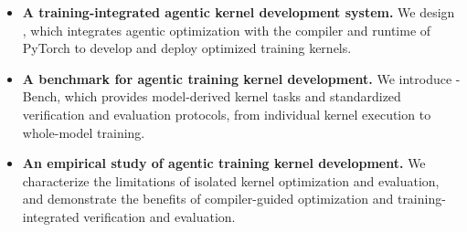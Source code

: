 \begin{itemize}
    \item \textbf{A training-integrated agentic kernel development system.} We design \name, which integrates agentic optimization with the compiler and runtime of PyTorch to develop and deploy optimized training kernels.
    \item \textbf{A benchmark for agentic training kernel development.} We introduce \name-Bench, which provides model-derived kernel tasks and standardized verification and evaluation protocols, from individual kernel execution to whole-model training.
    \item \textbf{An empirical study of agentic training kernel development.} We characterize the limitations of isolated kernel optimization and evaluation, and demonstrate the benefits of compiler-guided optimization and training-integrated verification and evaluation.
\end{itemize}







